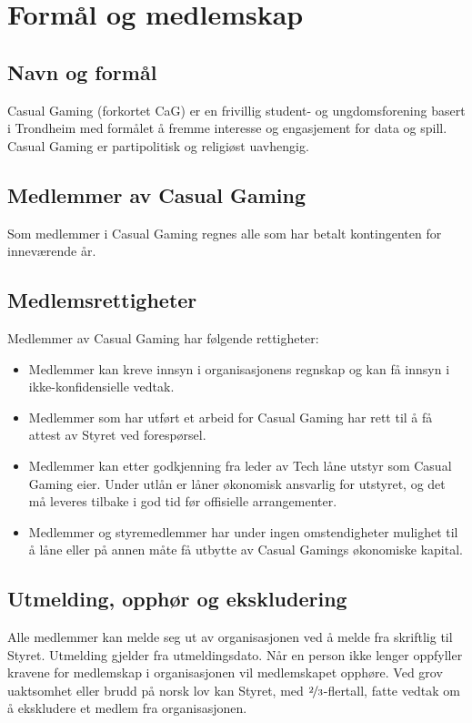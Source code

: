 \chapter{Formål og medlemskap}

\section{Navn og formål}
Casual Gaming (forkortet CaG) er en frivillig student- og ungdomsforening basert i Trondheim med formålet å fremme interesse og engasjement for data og spill. Casual Gaming er partipolitisk og religiøst uavhengig.

\section{Medlemmer av Casual Gaming}
Som medlemmer i Casual Gaming regnes alle som har betalt kontingenten for inneværende år.

\section{Medlemsrettigheter}
Medlemmer av Casual Gaming har følgende rettigheter:
\begin{itemize}
    \item Medlemmer kan kreve innsyn i organisasjonens regnskap og kan få innsyn i ikke-konfidensielle vedtak.
    \item Medlemmer som har utført et arbeid for Casual Gaming har rett til å få attest av Styret ved forespørsel.
    \item Medlemmer kan etter godkjenning fra leder av Tech låne utstyr som Casual Gaming eier. Under utlån er låner økonomisk ansvarlig for utstyret, og det må leveres tilbake i god tid før offisielle arrangementer.
    \item Medlemmer og styremedlemmer har under ingen omstendigheter mulighet til å låne eller på annen måte få utbytte av Casual Gamings økonomiske kapital.
\end{itemize}

\section{Utmelding, opphør og ekskludering}
Alle medlemmer kan melde seg ut av organisasjonen ved å melde fra skriftlig til Styret. Utmelding gjelder fra utmeldingsdato. Når en person ikke lenger oppfyller kravene for medlemskap i organisasjonen vil medlemskapet opphøre. Ved grov uaktsomhet eller brudd på norsk lov kan Styret, med $\nicefrac{2}{3}$-flertall, fatte vedtak om å ekskludere et medlem fra organisasjonen.
